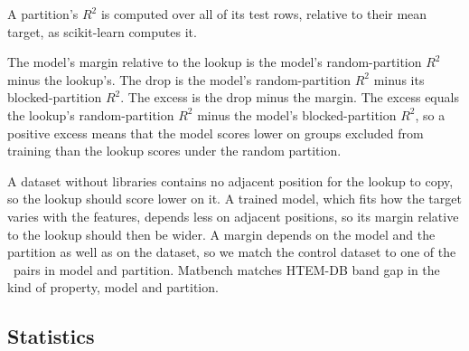 \documentclass[11pt]{article}
\begin{document}
A partition's $R^2$ is computed over all of its test rows, relative to their
mean target, as scikit-learn computes it.

The model's margin relative to the lookup is the model's
random-partition $R^2$ minus the lookup's. The drop is the model's
random-partition $R^2$ minus its blocked-partition $R^2$. The excess is the
drop minus the margin. The excess equals the lookup's random-partition $R^2$
minus the model's blocked-partition $R^2$, so a positive excess means that the
model scores lower on groups excluded from training than the lookup scores
under the random partition.

A dataset without libraries contains no adjacent position for the lookup to
copy, so the lookup should score lower on it. A trained model, which fits how
the target varies with the features, depends less on adjacent positions, so
its margin relative to the lookup should then be wider. A margin depends on the
model and the partition as well as on the dataset, so we match the control
dataset to one of the \randomPairs\ pairs in model and partition. Matbench matches
HTEM-DB band gap in the kind of property, model and partition.

\subsection*{Statistics}
\label{sec:statistics}
\end{document}
